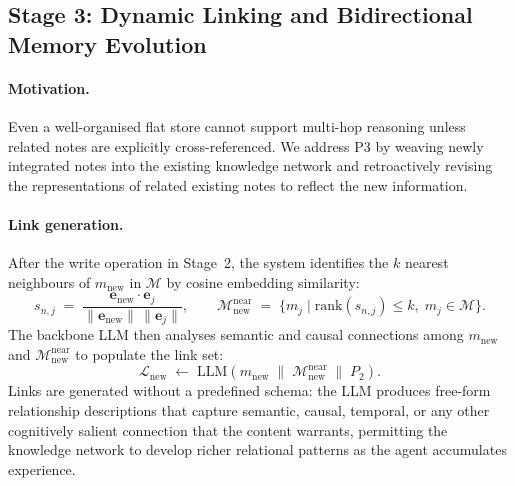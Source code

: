 \documentclass{article}
\newcommand{\memset}{\mathcal{M}}
\newcommand{\note}{m}
\begin{document}
\subsection{Stage 3: Dynamic Linking and Bidirectional Memory Evolution}
\label{sec:stage3}

\paragraph{Motivation.}
Even a well-organised flat store cannot support multi-hop reasoning unless
related notes are explicitly cross-referenced.
We address P3 by weaving newly integrated notes into the existing knowledge
network and retroactively revising the representations of related existing
notes to reflect the new information.

\paragraph{Link generation.}
After the write operation in Stage~2, the system identifies the $k$ nearest
neighbours of $\note_{\mathrm{new}}$ in $\memset$ by cosine embedding
similarity:
\begin{equation}
  s_{n,j} \;=\;
  \frac{\mathbf{e}_{\mathrm{new}} \cdot \mathbf{e}_j}
       {\|\mathbf{e}_{\mathrm{new}}\|\,\|\mathbf{e}_j\|},
  \qquad
  \memset_{\mathrm{new}}^{\mathrm{near}}
  \;=\;
  \bigl\{\note_j \mid \mathrm{rank}(s_{n,j}) \leq k,\;
  \note_j \in \memset\bigr\}.
  \label{eq:nearest_neighbours}
\end{equation}
The backbone LLM then analyses semantic and causal connections among
$\note_{\mathrm{new}}$ and $\memset_{\mathrm{new}}^{\mathrm{near}}$ to
populate the link set:
\begin{equation}
  \mathcal{L}_{\mathrm{new}}
  \;\leftarrow\;
  \mathrm{LLM}\!\left(
    \note_{\mathrm{new}} \;\|\;
    \memset_{\mathrm{new}}^{\mathrm{near}} \;\|\; P_2
  \right).
  \label{eq:link_generation}
\end{equation}
Links are generated without a predefined schema: the LLM produces free-form
relationship descriptions that capture semantic, causal, temporal, or any
other cognitively salient connection that the content warrants, permitting the
knowledge network to develop richer relational patterns as the agent
accumulates experience.
\end{document}
